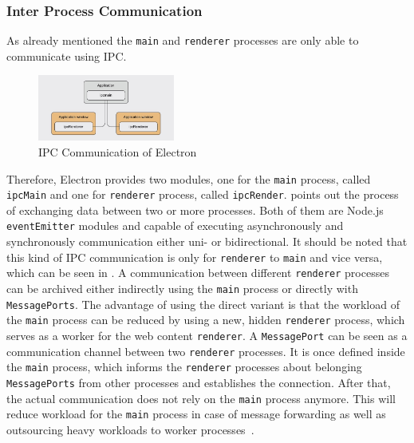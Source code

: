 \subsubsection{Inter Process Communication}
\label{subsubsec:electron:ipc}
As already mentioned the \texttt{main} and \texttt{renderer} processes are only able to communicate using \ac{IPC}.
\begin{figure}[ht]
    \centering
    \includegraphics[width=0.4\textwidth]{images/ipcElectron}
    \caption[Bla]{IPC Communication of Electron~\cite[Fig. 6.5]{electron-nwjs}}
    \label{fig:electron:ipc}
\end{figure}
Therefore, Electron provides two modules, one for the \texttt{main} process, called \texttt{ipcMain} and one for \texttt{renderer} process, called \texttt{ipcRender}.
 points out the process of exchanging data between two or more processes.
Both of them are Node.js \texttt{eventEmitter} modules and capable of executing asynchronously and synchronously communication either uni- or bidirectional.
It should be noted that this kind of \ac{IPC} communication is only for \texttt{renderer} to \texttt{main} and vice versa, which can be seen in .
A communication between different \texttt{renderer} processes can be archived either indirectly using the \texttt{main} process or directly with \texttt{MessagePorts}.
The advantage of using the direct variant is that the workload of the \texttt{main} process can be reduced by using a new, hidden \texttt{renderer} process, which serves as a worker for the web content \texttt{renderer}.
A \texttt{MessagePort} can be seen as a communication channel between two \texttt{renderer} processes.
It is once defined inside the \texttt{main} process, which informs the \texttt{renderer} processes about belonging \texttt{MessagePorts} from other processes and establishes the connection.
After that, the actual communication does not rely on the \texttt{main} process anymore.
This will reduce workload for the \texttt{main} process in case of message forwarding as well as outsourcing heavy workloads to worker processes~\cite{ElectronDoc}.
